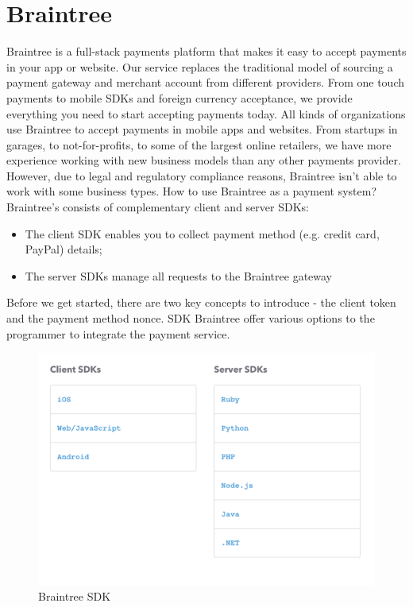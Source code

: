 \section{Braintree}
\label{sec:braintree}
Braintree is a full-stack payments platform that makes it easy to accept payments in your app or website. Our service replaces the traditional model of sourcing a payment gateway and merchant account from different providers. From one touch payments to mobile SDKs and foreign currency acceptance, we provide everything you need to start accepting payments today.
\newline
All kinds of organizations use Braintree to accept payments in mobile apps and websites. From startups in garages, to not-for-profits, to some of the largest online retailers, we have more experience working with new business models than any other payments provider. However, due to legal and regulatory compliance reasons, Braintree isn't able to work with some business types. How to use Braintree as a payment system?
Braintree's  consists of complementary client and server SDKs:
\begin{itemize}
  \item The client SDK enables you to collect payment method (e.g. credit card, PayPal) details;
  \item The server SDKs manage all requests to the Braintree gateway
\end{itemize}
Before we get started, there are two key concepts to introduce - the client token and the payment method nonce.
\newline
SDK Braintree offer various options to the programmer to integrate the payment service.
\begin{figure}[htb]
  \centering
  \includegraphics[width=1.0\linewidth]{images/chapter2/braintree-sdk.png}\hfill
  \caption[Braintree SDK]{Braintree SDK}
\label{fig:braintree_sdk}
\end{figure}
